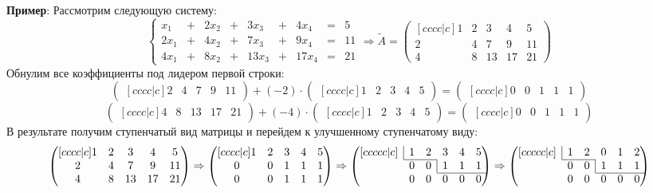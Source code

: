 \documentclass[12pt]{article}
\theoremstyle{definition}
\newcommand{\wte}[1]{\widetilde{#1}}
\begin{document}
\textbf{Пример}: Рассмотрим следующую систему:
$$
	\left\{
	\begin{array}{ccccccccc}
		x_1 &+& 2 x_2 &+& 3x_3 &+& 4x_4 &=& 5\\
		2x_1 &+& 4x_2 &+& 7x_3 &+& 9x_4 &=& 11\\
		4x_1 &+& 8x_2 &+& 13x_3 &+& 17 x_4 & = & 21
	\end{array}\right. \Rightarrow \wte{A} = 
	\begin{pmatrix}[cccc|c]
		1 & 2 & 3 & 4 & 5\\
		2 & 4 & 7 & 9 & 11 \\
		4 & 8 & 13 & 17 & 21
	\end{pmatrix}
$$
Обнулим все коэффициенты под  лидером первой строки:
$$
	\begin{pmatrix}[cccc|c]
		2 & 4 & 7 & 9 & 11
	\end{pmatrix} + (-2){\cdot}
	\begin{pmatrix}[cccc|c]
		1 & 2 & 3 & 4 & 5
	\end{pmatrix} = 
	\begin{pmatrix}[cccc|c]
		0 & 0 & 1 & 1 & 1
	\end{pmatrix}
$$
$$
	\begin{pmatrix}[cccc|c]
		4 & 8 & 13 & 17 & 21
	\end{pmatrix} + (-4){\cdot}
	\begin{pmatrix}[cccc|c]
		1 & 2 & 3 & 4 & 5
	\end{pmatrix} = 
	\begin{pmatrix}[cccc|c]
		0 & 0 & 1 & 1 & 1
	\end{pmatrix}
$$
В результате получим ступенчатый вид матрицы и перейдем к улучшенному ступенчатому виду:
$$
	\begin{pmatrix}[cccc|c]
		1 & 2 & 3 & 4 & 5\\
		2 & 4 & 7 & 9 & 11 \\
		4 & 8 & 13 & 17 & 21
	\end{pmatrix} \Rightarrow
	\begin{pmatrix}[cccc|c]
		1 & 2 & 3 & 4 & 5\\
		0 & 0 & 1 & 1 & 1 \\
		0 & 0 & 1 & 1 & 1
	\end{pmatrix} \Rightarrow 
	\begin{pmatrix}[ccccc|c]
		&\multicolumn{1}{|c}{1} & 2 & 3 & 4 & 5  \\ \cline{2-3}
		&0 & 0 & \multicolumn{1}{|c}{1} & 1 & 1 \\ \cline{4-6}
		&0 & 0 & 0 & 0 & 0
	\end{pmatrix} \Rightarrow
	\begin{pmatrix}[ccccc|c]
		&\multicolumn{1}{|c}{1} & 2 & 0 & 1 & 2  \\ \cline{2-3}
		&0 & 0 & \multicolumn{1}{|c}{1} & 1 & 1 \\ \cline{4-6}
		&0 & 0 & 0 & 0 & 0
	\end{pmatrix}
$$
\end{document}
